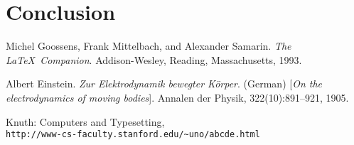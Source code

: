 \documentclass[12pt]{article}
\begin{document}
\section{Conclusion}



\begin{thebibliography}{12}
Michel Goossens, Frank Mittelbach, and Alexander Samarin. 
\textit{The \LaTeX\ Companion}. 
Addison-Wesley, Reading, Massachusetts, 1993.
 
Albert Einstein. 
\textit{Zur Elektrodynamik bewegter K{\"o}rper}. (German) 
[\textit{On the electrodynamics of moving bodies}]. 
Annalen der Physik, 322(10):891–921, 1905.
 
Knuth: Computers and Typesetting,
\\\texttt{http://www-cs-faculty.stanford.edu/\~{}uno/abcde.html}
\end{thebibliography}
\end{document}
